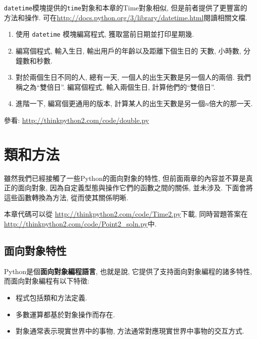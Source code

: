\documentclass[10pt]{book}
\begin{document}
\begin{exercise}

{\tt datetime}模塊提供的{\tt time}對象和本章的Time對象相似, 
但是前者提供了更豐富的方法和操作. 
可在\url{http://docs.python.org/3/library/datetime.html}閱讀相關文檔.

\begin{enumerate}

\item 使用 {\tt datetime} 模塊編寫程式, 獲取當前日期並打印星期幾. 

\item 編寫個程式, 輸入生日, 輸出用戶的年齡以及距離下個生日的
天數, 小時數, 分鐘數和秒數. 

\item 對於兩個生日不同的人, 
總有一天, 一個人的出生天數是另一個人的兩倍. 
我們稱之為``雙倍日''.
編寫個程式, 輸入兩個生日, 計算他們的``雙倍日''.

\item 進階一下, 編寫個更通用的版本, 計算某人的出生天數是另一個$n$倍大的那一天. 

\end{enumerate}

參看: \url{http://thinkpython2.com/code/double.py}

\end{exercise}


\chapter{類和方法}

雖然我們已經接觸了一些Python的面向對象的特性, 
但前面兩章的內容並不算是真正的面向對象, 
因為自定義型態與操作它們的函數之間的關係, 並未涉及. 
下面會將這些函數轉換為方法, 從而使其關係明晰. 

本章代碼可以從
\url{http://thinkpython2.com/code/Time2.py}下載, 
同時習題答案在\url{http://thinkpython2.com/code/Point2_soln.py}中.


\section{面向對象特性}

Python是個{\bf 面向對象編程語言}, 
也就是說, 它提供了支持面向對象編程的諸多特性, 而面向對象編程有以下特徵:

\begin{itemize}

\item 程式包括類和方法定義.

\item 多數運算都基於對象操作而存在. 

\item 對象通常表示現實世界中的事物, 方法通常對應現實世界中事物的交互方式. 

\end{itemize}
\end{document}
